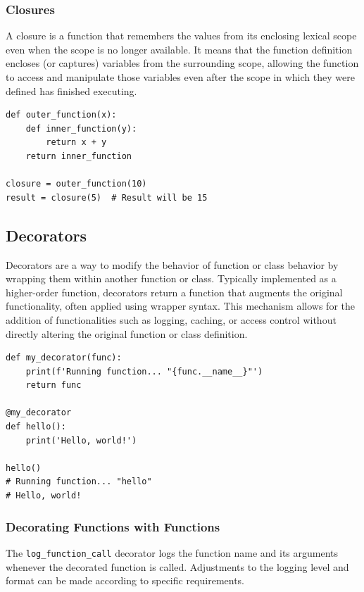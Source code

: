 \subsubsection{Closures}
A closure is a function that remembers the values from its enclosing lexical scope even when the scope is no longer available. It means that the function definition encloses (or captures) variables from the surrounding scope, allowing the function to access and manipulate those variables even after the scope in which they were defined has finished executing.

\begin{codebox}
\begin{verbatim}
def outer_function(x):
    def inner_function(y):
        return x + y
    return inner_function

closure = outer_function(10)
result = closure(5)  # Result will be 15
\end{verbatim}
\end{codebox}

\newpage
\subsection{Decorators}

Decorators are a way to modify the behavior of function or class behavior by wrapping them within another function or class. Typically implemented as a higher-order function, decorators return a function that augments the original functionality, often applied using wrapper syntax. This mechanism allows for the addition of functionalities such as logging, caching, or access control without directly altering the original function or class definition.

\begin{codebox}
\begin{verbatim}
def my_decorator(func):
    print(f'Running function... "{func.__name__}"')
    return func

@my_decorator
def hello():
    print('Hello, world!')

hello()
# Running function... "hello"
# Hello, world!
\end{verbatim}
\end{codebox}

\subsubsection{Decorating Functions with Functions}
The \texttt{log\_function\_call} decorator logs the function name and its arguments whenever the decorated function is called. Adjustments to the logging level and format can be made according to specific requirements.

